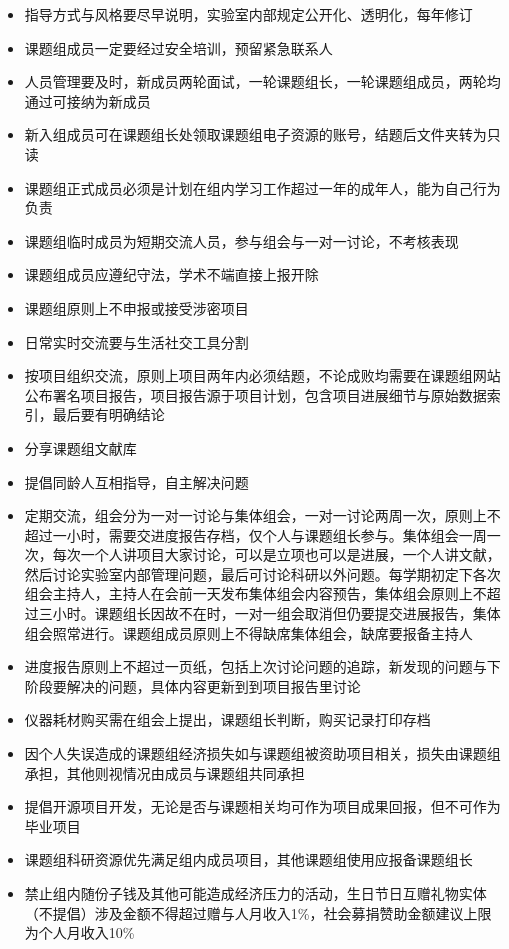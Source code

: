\documentclass[]{tufte-book}
\providecommand{\tightlist}{%
  \setlength{\itemsep}{0pt}\setlength{\parskip}{0pt}}
\begin{document}
\begin{itemize}
\tightlist
\item
  指导方式与风格要尽早说明，实验室内部规定公开化、透明化，每年修订
\item
  课题组成员一定要经过安全培训，预留紧急联系人
\item
  人员管理要及时，新成员两轮面试，一轮课题组长，一轮课题组成员，两轮均通过可接纳为新成员
\item
  新入组成员可在课题组长处领取课题组电子资源的账号，结题后文件夹转为只读
\item
  课题组正式成员必须是计划在组内学习工作超过一年的成年人，能为自己行为负责
\item
  课题组临时成员为短期交流人员，参与组会与一对一讨论，不考核表现
\item
  课题组成员应遵纪守法，学术不端直接上报开除
\item
  课题组原则上不申报或接受涉密项目
\item
  日常实时交流要与生活社交工具分割
\item
  按项目组织交流，原则上项目两年内必须结题，不论成败均需要在课题组网站公布署名项目报告，项目报告源于项目计划，包含项目进展细节与原始数据索引，最后要有明确结论
\item
  分享课题组文献库
\item
  提倡同龄人互相指导，自主解决问题
\item
  定期交流，组会分为一对一讨论与集体组会，一对一讨论两周一次，原则上不超过一小时，需要交进度报告存档，仅个人与课题组长参与。集体组会一周一次，每次一个人讲项目大家讨论，可以是立项也可以是进展，一个人讲文献，然后讨论实验室内部管理问题，最后可讨论科研以外问题。每学期初定下各次组会主持人，主持人在会前一天发布集体组会内容预告，集体组会原则上不超过三小时。课题组长因故不在时，一对一组会取消但仍要提交进展报告，集体组会照常进行。课题组成员原则上不得缺席集体组会，缺席要报备主持人
\item
  进度报告原则上不超过一页纸，包括上次讨论问题的追踪，新发现的问题与下阶段要解决的问题，具体内容更新到到项目报告里讨论
\item
  仪器耗材购买需在组会上提出，课题组长判断，购买记录打印存档
\item
  因个人失误造成的课题组经济损失如与课题组被资助项目相关，损失由课题组承担，其他则视情况由成员与课题组共同承担
\item
  提倡开源项目开发，无论是否与课题相关均可作为项目成果回报，但不可作为毕业项目
\item
  课题组科研资源优先满足组内成员项目，其他课题组使用应报备课题组长
\item
  禁止组内随份子钱及其他可能造成经济压力的活动，生日节日互赠礼物实体（不提倡）涉及金额不得超过赠与人月收入1\%，社会募捐赞助金额建议上限为个人月收入10\%

\end{itemize}
\end{document}
